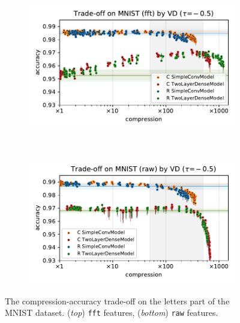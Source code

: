 \documentclass[a4paper,10pt]{article}
\begin{document}
\begin{figure}[!h]
  \centering
  \begin{subfigure}[b]{1.\textwidth}  %
    \centering
    \includegraphics[width=\linewidth]{../assets/figure__mnist-like__trade-off/legacy__VD__mnist__fft__-0.5.pdf}
  \end{subfigure} \\%
  \begin{subfigure}[b]{1.\textwidth}  %
    \centering
    \includegraphics[width=\linewidth]{../assets/figure__mnist-like__trade-off/legacy__VD__mnist__raw__-0.5.pdf}
  \end{subfigure}
  \caption{%
    The compression-accuracy trade-off on the letters part of the MNIST dataset.
    (\textit{top}) \texttt{fft} features, (\textit{bottom}) \texttt{raw} features.
  }
  \label{fig:mnist-like__trade-off__mnist}
\end{figure}


\end{document}
